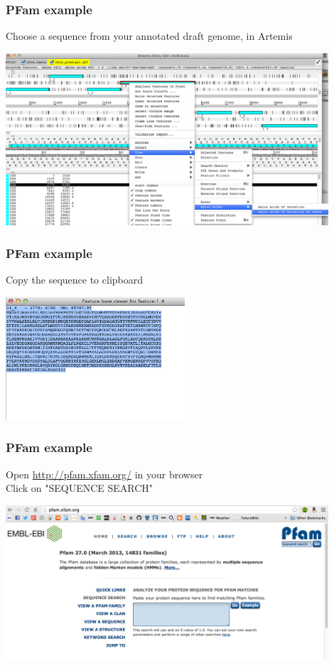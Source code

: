 \documentclass[table]{beamer}
\begin{document}
    \begin{frame}
      \frametitle{PFam example}  
      Choose a sequence from your annotated draft genome, in Artemis \\
      \begin{center}
        \includegraphics[width=0.9\textwidth]{images/pfam5} 
      \end{center}      
    \end{frame}

    \begin{frame}
      \frametitle{PFam example}  
      Copy the sequence to clipboard
      \begin{center}
        \includegraphics[width=0.5\textwidth]{images/pfam6} 
      \end{center}      
    \end{frame}

    \begin{frame}
      \frametitle{PFam example}  
      Open \url{http://pfam.xfam.org/} in your browser \\
      Click on "SEQUENCE SEARCH"
      \begin{center}
        \includegraphics[width=0.9\textwidth]{images/pfam7} 
      \end{center}      
    \end{frame}
\end{document}
